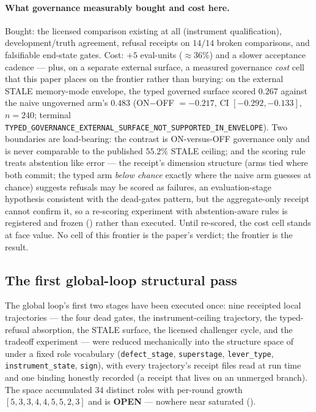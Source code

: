 \paragraph{What governance measurably bought and cost here.} Bought: the licensed
comparison existing at all (instrument qualification), development/truth agreement,
refusal receipts on $14/14$ broken comparisons, and falsifiable end-state gates.
Cost: $+5$ eval-units ($\approx 36\%$) and a slower acceptance cadence --- plus, on a
separate external surface, a measured governance \emph{cost} cell that this paper
places on the frontier rather than burying: on the external STALE memory-mode
envelope, the typed governed surface scored $0.267$ against the naive ungoverned
arm's $0.483$ (ON$-$OFF $=-0.217$, CI $[-0.292,-0.133]$, $n=240$;
terminal \texttt{TYPED\_GOVERNANCE\_EXTERNAL\_SURFACE\_NOT\_SUPPORTED\_IN\_ENVELOPE}).
Two boundaries are load-bearing: the contrast is ON-versus-OFF governance only and is
never comparable to the published $55.2\%$ STALE ceiling; and the scoring rule treats
abstention like error --- the receipt's dimension structure (arms tied where both
commit; the typed arm \emph{below chance} exactly where the naive arm guesses at
chance) suggests refusals may be scored as failures, an evaluation-stage hypothesis
consistent with the dead-gates pattern, but the aggregate-only receipt cannot confirm
it, so a re-scoring experiment with abstention-aware rules is registered and frozen
() rather than executed. Until re-scored, the
cost cell stands at face value. No cell of this frontier is the paper's verdict; the
frontier is the result.

\subsection{The first global-loop structural pass}
\label{sec:global-pass}

The global loop's first two stages have been executed once: nine receipted local
trajectories --- the four dead gates, the instrument-ceiling trajectory, the
typed-refusal absorption, the STALE surface, the licensed challenger cycle, and the
tradeoff experiment --- were reduced mechanically into the structure space of
 under a fixed role vocabulary
(\texttt{defect\_stage}, \texttt{superstage}, \texttt{lever\_type},
\texttt{instrument\_state}, \texttt{sign}), with every trajectory's receipt files
read at run time and one binding honestly recorded \CANNOTCHECK{} (a receipt that
lives on an unmerged branch). The space accumulated $34$ distinct roles with
per-round growth $[5,3,3,4,4,5,5,2,3]$ and is \textbf{OPEN} --- nowhere near
saturated ().


